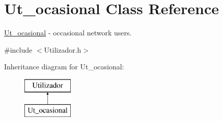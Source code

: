 \hypertarget{class_ut__ocasional}{\section{Ut\+\_\+ocasional Class Reference}
\label{class_ut__ocasional}
}


\hyperlink{class_ut__ocasional}{Ut\+\_\+ocasional} -\/ occasional network users.  




{\ttfamily \#include $<$Utilizador.\+h$>$}

Inheritance diagram for Ut\+\_\+ocasional\+:\begin{figure}[H]
\begin{center}
\leavevmode
\includegraphics[height=2.000000cm]{class_ut__ocasional}
\end{center}
\end{figure}
